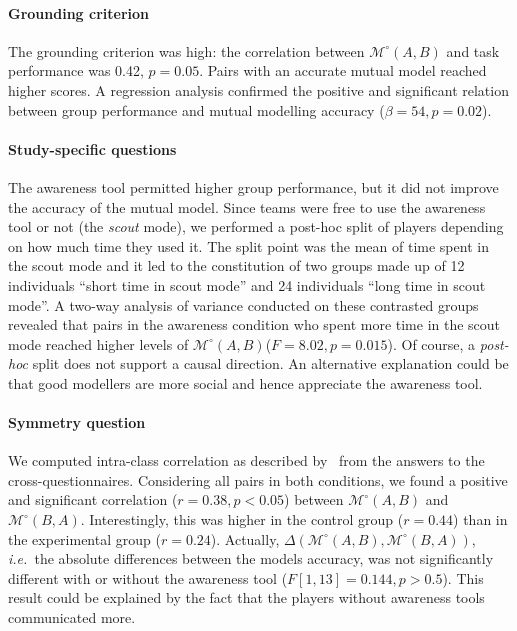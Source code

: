 \documentclass[natbib]{svjour3}
\newcommand{\ie}{{\textit{i.e.\ }}}
\newcommand{\gModel}[2]{{$\mathcal{M}^{\circ}(#1, #2)$}}
\newcommand{\gMdeg}[2]{{\mathcal{M}^{\circ}(#1, #2)}}
\begin{document}
\paragraph{Grounding criterion} The grounding criterion was high: the
correlation between \gModel{A}{B} and task performance was 0.42, $p = 0.05$.
Pairs with an accurate mutual model reached higher scores. A regression analysis
confirmed the positive and significant relation between group performance and
mutual modelling accuracy ($\beta=54, p = 0.02$).

\paragraph{Study-specific questions} The awareness tool permitted higher group
performance, but it did not improve the accuracy of the mutual model. Since
teams were free to use the awareness tool or not (the \emph{scout} mode), we
performed a post-hoc split of players depending on how much time they used it.
The split point was the mean of time spent in the scout mode and it led to the
constitution of two groups made up of 12 individuals ``short time in scout
mode'' and 24 individuals ``long time in scout mode''. A two-way analysis of
variance conducted on these contrasted groups revealed that pairs in the
awareness condition who spent more time in the scout mode reached higher levels
of \gModel{A}{B}($F = 8.02, p = 0.015$). Of course, a \textit{post-hoc} split
does not support a causal direction. An alternative explanation could be that
good modellers are more social and hence appreciate the awareness tool.

\paragraph{Symmetry question} We computed intra-class correlation as described
by~\citet{kenny1998data} from the answers to the cross-questionnaires.
Considering all pairs in both conditions, we found a positive and significant
correlation ($r = 0.38, p < 0.05$) between \gModel{A}{B} and \gModel{B}{A}.
Interestingly, this was higher in the control group ($r = 0.44$) than in the
experimental group ($r = 0.24$). Actually, $\Delta(\gMdeg{A}{B},\gMdeg{B}{A})$,
\ie the absolute differences between the models accuracy, was not significantly
different with or without the awareness tool ($F [1,13]= 0.144, p > 0.5$). This
result could be explained by the fact that the players without awareness tools
communicated more.
\end{document}
